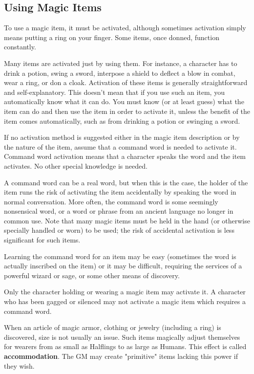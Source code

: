 \documentclass[a4paper,twoside,openany,10pt]{book}
\begin{document}
\begin{multicols}{2}
	
\subsection{Using Magic Items}\label{using-magic-items}

To use a magic item, it must be activated, although sometimes activation simply means putting a ring on your finger. Some items, once donned, function constantly.

Many items are activated just by using them. For instance, a character has to drink a potion, swing a sword, interpose a shield to deflect a blow in combat, wear a ring, or don a cloak. Activation of these items is generally straightforward and self-explanatory. This doesn't mean  that if you use such an item, you automatically know what it can do. You must know (or at least guess) what the item can do and then use the item in order to activate it, unless the benefit of the item comes automatically, such as from drinking a potion or swinging a sword.

If no activation method is suggested either in the magic item description or by the nature of the item, assume that a command word is needed to activate it. Command word activation means that a character speaks the word and the item activates. No other special knowledge is  needed.

A command word can be a real word, but when this is the case, the holder of the item runs the risk of activating the item accidentally by speaking the word in normal conversation. More often, the command word is some seemingly nonsensical word, or a word or phrase from an ancient language no longer in common use. Note that many magic items must be held in the hand (or otherwise specially handled or worn) to be used; the risk of accidental activation is less significant for such items.

Learning the command word for an item may be easy (sometimes the word is actually inscribed on the item) or it may be difficult, requiring the services of a powerful wizard or sage, or some other means of discovery. 

Only the character holding or wearing a magic item may activate it. A character who has been gagged or silenced may not activate a magic item which requires a command word.

When an article of magic armor, clothing or jewelry (including a ring) is discovered, size is not usually an issue. Such items magically adjust themselves for wearers from as small as Halflings to as large as Humans. This effect is called \textbf{accommodation}. The GM may create "primitive" items lacking this power if they wish. 


\end{multicols}
\end{document}
